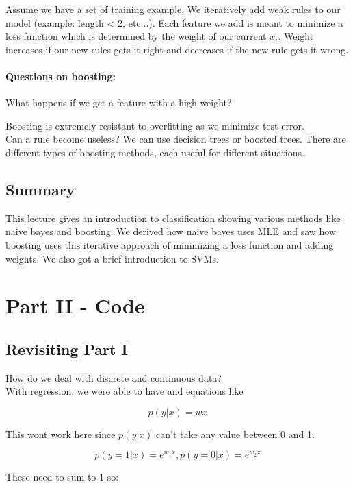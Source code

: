 Assume we have a set of training example. We iteratively add weak rules to our model (example: length < 2, etc...). Each feature we add is meant to minimize a loss function which is determined by the weight of our current $x_i$. Weight increases if our new rules gets it right and decreases if the new rule gets it wrong.

\paragraph{Questions on boosting:\\}

What happens if we get a feature with a high weight?

Boosting is extremely resistant to overfitting as we minimize test error.\\

Can a rule become useless?
We can use decision trees or boosted trees. There are different types of boosting methods, each useful for different situations.  

\subsection{Summary}

This lecture gives an introduction to classification showing various methods like naive bayes and boosting. We derived how naive bayes uses MLE and saw how boosting uses this iterative approach of minimizing a loss function and adding weights. We also got a brief introduction to SVMs.
	 
\section{Part II - Code}

\subsection{Revisiting Part I}

How do we deal with discrete and continuous data?\\
With regression, we were able to have and equations like

$$p(y|x) = wx$$

This wont work here since $p(y|x)$ can't take any value between 0 and 1.

$$p(y=1|x) = e^{w_1x}, p(y=0|x) = e^{w_2x}$$

These need to sum to 1 so:

